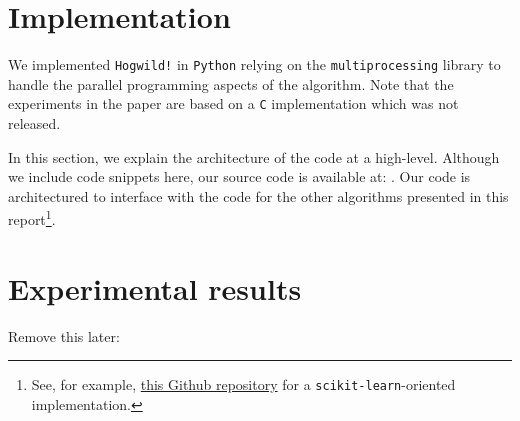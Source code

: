 \documentclass[twoside,11pt]{article}
\newcommand{\todo}[1]{\textbf{\color{red}{[TODO: #1]}}}
\begin{document}
\section{Implementation}
We implemented \texttt{Hogwild!} in \texttt{Python} relying on the \texttt{multiprocessing} library to handle the parallel programming aspects of the algorithm. Note that the experiments in the paper are based on a \texttt{C} implementation which was not released. 

In this section, we explain the architecture of the code at a high-level. Although we include code snippets here, our source code is available at: \todo{github address}. Our code is architectured to interface with the code for the other algorithms presented in this report\footnote{See, for example, \href{https://github.com/srome/sklearn-hogwild}{this Github repository} for a \texttt{scikit-learn}-oriented implementation.}.



\section{Experimental results}

\newpage
Remove this later: \cite{ciliberto_general_2020}


\vskip 0.2in
\newpage

\end{document}

